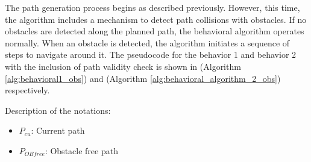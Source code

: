 The path generation process begins as described previously. However, this time, the algorithm includes a mechanism to detect path collisions with obstacles. If no obstacles are detected along the planned path, the behavioral algorithm operates normally. When an obstacle is detected, the algorithm initiates a sequence of steps to navigate around it. The pseudocode for the behavior 1 and behavior 2 with the inclusion of path validity check is shown in (Algorithm \autoref{alg:behavioral1_obs}) and (Algorithm \autoref{alg:behavioral_algorithm_2_obs}) respectively.

\vspace*{6mm}  



Description of the notations:
\begin{itemize}[noitemsep,topsep=0pt]
    \item $P_{cu}$: Current path
    \item $P_{OB free}$: Obstacle free path
\end{itemize}

